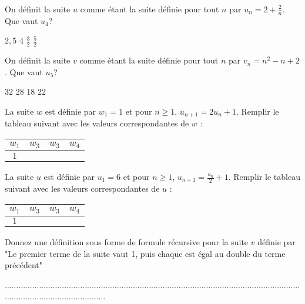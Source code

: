 \documentclass[10pt,a4paper]{exam}
\date{}
\begin{document}
On définit la suite $u$ comme étant la suite définie pour tout $n$ par $u_n = 2 + \frac{2}{n}$. Que vaut $u_4$?

\begin{oneparcheckboxes}
   \choice $2,5$
   \choice $4$
   \choice $\frac{3}{2}$
   \choice $\frac{5}{2}$
\end{oneparcheckboxes}

\vspace{10 mm}
 
On définit la suite $v$ comme étant la suite définie pour tout $n$ par $v_n = n^2 - n +  2$. Que vaut $u_5$?

\begin{oneparcheckboxes}
   \choice $32$
   \choice $28$
   \choice $18$
   \choice $22$
\end{oneparcheckboxes}
 
\vspace{10 mm}

La suite $w$ est définie par $w_1=1$  et pour $n\geq 1$, $u_{n+1} = 2u_n +1$. Remplir le tableau suivant avec les valeurs correspondantes de $w$ :


\begin{tabular}{|c|c|c|c|}
   \hline
   $w_1$ & $w_3$ & $w_3$ & $w_4$  \\
   \hline
   $1$ &   &  & \\
   \hline
\end{tabular}


\vspace{10 mm}

La suite $u$ est définie par $u_1=6$  et pour $n\geq 1$, $u_{n+1} = \frac{u_n}{2} +1$. Remplir le tableau suivant avec les valeurs correspondantes de $u$ :

\begin{tabular}{|c|c|c|c|}
   \hline
   $w_1$ & $w_3$ & $w_3$ & $w_4$  \\
   \hline
   $1$ &   &  & \\
   \hline
\end{tabular}

\vspace{10 mm}

Donnez une définition sous forme de formule récursive pour la suite $v$ définie par  "Le premier terme de la suite vaut 1, puis chaque est égal au double du terme précédent"

\vspace{5 mm}

.............................................................................................................................................................................
\end{document}
